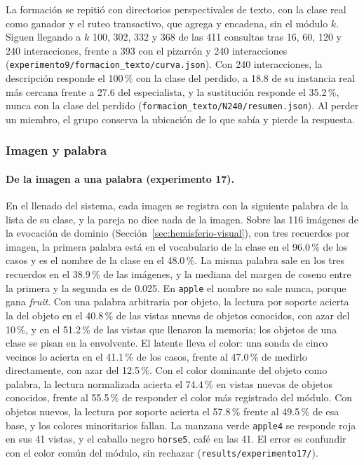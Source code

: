 La formación se repitió con directorios perspectivales de texto, con la clase real
como ganador y el ruteo transactivo, que agrega y encadena, sin el módulo $k$.
Siguen llegando a $k$ 100, 302, 332 y 368 de las 411 consultas tras 16, 60, 120 y 240
interacciones, frente a 393 con el pizarrón y 240 interacciones
(\texttt{experimento9/formacion\_texto/curva.json}).
Con 240 interacciones, la descripción responde el 100\,\% con la clase del perdido, a
18.8 de su instancia real más cercana frente a 27.6 del especialista, y la sustitución
responde el 35.2\,\%, nunca con la clase del perdido
(\texttt{formacion\_texto/N240/resumen.json}).
Al perder un miembro, el grupo conserva la ubicación de lo que sabía y pierde la
respuesta.

\subsubsection{Imagen y palabra}
\label{sec:fase4-imagen-palabra}

\paragraph{De la imagen a una palabra (experimento 17).}
En el llenado del sistema, cada imagen se registra con la siguiente palabra de la lista
de su clase, y la pareja no dice nada de la imagen.
Sobre las 116 imágenes de la evocación de dominio (Sección~\ref{sec:hemisferio-visual}),
con tres recuerdos por imagen, la primera palabra está en el vocabulario de la clase en
el 96.0\,\% de los casos y es el nombre de la clase en el 48.0\,\%.
La misma palabra sale en los tres recuerdos en el 38.9\,\% de las imágenes, y la
mediana del margen de coseno entre la primera y la segunda es de 0.025.
En \texttt{apple} el nombre no sale nunca, porque gana \textit{fruit}.
Con una palabra arbitraria por objeto, la lectura por soporte acierta la del objeto en el
40.8\,\% de las vistas nuevas de objetos conocidos, con azar del 10\,\%, y en el 51.2\,\%
de las vistas que llenaron la memoria; los objetos de una clase se pisan en la
envolvente.
El latente lleva el color: una sonda de cinco vecinos lo acierta en el 41.1\,\% de los
casos, frente al 47.0\,\% de medirlo directamente, con azar del 12.5\,\%.
Con el color dominante del objeto como palabra, la lectura normalizada acierta el
74.4\,\% en vistas nuevas de objetos conocidos, frente al 55.5\,\% de responder el color
más registrado del módulo.
Con objetos nuevos, la lectura por soporte acierta el 57.8\,\% frente al 49.5\,\% de esa
base, y los colores minoritarios fallan.
La manzana verde \texttt{apple4} se responde roja en sus 41 vistas, y el caballo negro
\texttt{horse5}, café en las 41.
El error es confundir con el color común del módulo, sin rechazar
(\texttt{results/experimento17/}).

